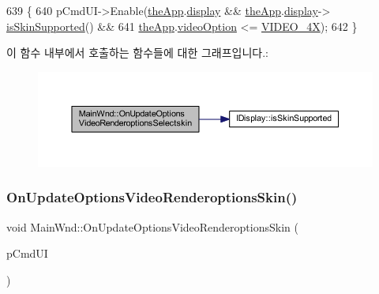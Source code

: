 \begin{DoxyCode}
639 \{
640   pCmdUI->Enable(\mbox{\hyperlink{_v_b_a_8cpp_a8095a9d06b37a7efe3723f3218ad8fb3}{theApp}}.\mbox{\hyperlink{class_v_b_a_a940e5bad8b3ed2436888dbcd03bfd563}{display}} && \mbox{\hyperlink{_v_b_a_8cpp_a8095a9d06b37a7efe3723f3218ad8fb3}{theApp}}.\mbox{\hyperlink{class_v_b_a_a940e5bad8b3ed2436888dbcd03bfd563}{display}}->
      \mbox{\hyperlink{class_i_display_ad717007b624f0a8e7c830ab803cd8a92}{isSkinSupported}}() &&
641                  \mbox{\hyperlink{_v_b_a_8cpp_a8095a9d06b37a7efe3723f3218ad8fb3}{theApp}}.\mbox{\hyperlink{class_v_b_a_a17dac073149c897f770c00ed7098ad32}{videoOption}} <= \mbox{\hyperlink{_v_b_a_8h_a531c35e38ede3ea4e5ba5afb24b29493a6468bce6b84e6350d3de126f257eb38d}{VIDEO\_4X}});
642 \}
\end{DoxyCode}
이 함수 내부에서 호출하는 함수들에 대한 그래프입니다.\+:
\nopagebreak
\begin{figure}[H]
\begin{center}
\leavevmode
\includegraphics[width=350pt]{class_main_wnd_a313b7202736612b30754e6b321246f28_cgraph}
\end{center}
\end{figure}
\mbox{\label{class_main_wnd_a2ad43f4ad55a02c28d1c288c4b5afe7c}} 
\subsubsection{\texorpdfstring{On\+Update\+Options\+Video\+Renderoptions\+Skin()}{OnUpdateOptionsVideoRenderoptionsSkin()}}
{\footnotesize\ttfamily void Main\+Wnd\+::\+On\+Update\+Options\+Video\+Renderoptions\+Skin (\begin{DoxyParamCaption}\item[{C\+Cmd\+UI $\ast$}]{p\+Cmd\+UI }\end{DoxyParamCaption})\hspace{0.3cm}{\ttfamily [protected]}}



